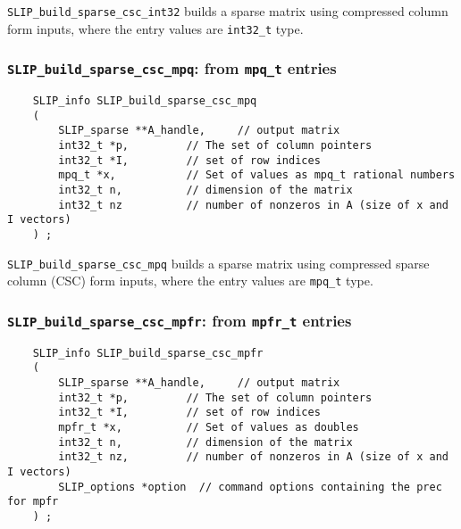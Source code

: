 \documentclass[12pt]{article}
\theoremstyle{definition}
\begin{document}
\verb|SLIP_build_sparse_csc_int32| builds a sparse matrix using compressed column
form inputs, where the entry values are \verb|int32_t| type.

\cprotect\subsubsection{\verb|SLIP_build_sparse_csc_mpq|: from \verb|mpq_t| entries}
\label{s:user:build_sparse_csc_mpq}

\begin{mdframed}[userdefinedwidth=6in]
{\footnotesize
\begin{verbatim}
    SLIP_info SLIP_build_sparse_csc_mpq
    (
        SLIP_sparse **A_handle,     // output matrix
        int32_t *p,         // The set of column pointers
        int32_t *I,         // set of row indices
        mpq_t *x,           // Set of values as mpq_t rational numbers
        int32_t n,          // dimension of the matrix
        int32_t nz          // number of nonzeros in A (size of x and I vectors)
    ) ;
\end{verbatim}
} \end{mdframed}

\verb|SLIP_build_sparse_csc_mpq| builds a sparse matrix using compressed
sparse column (CSC) form inputs, where the entry values are \verb|mpq_t| type.

\cprotect\subsubsection{\verb|SLIP_build_sparse_csc_mpfr|: from \verb|mpfr_t| entries}
\label{s:user:build_sparse_csc_mpfr}

\begin{mdframed}[userdefinedwidth=6in]
{\footnotesize
\begin{verbatim}
    SLIP_info SLIP_build_sparse_csc_mpfr
    (
        SLIP_sparse **A_handle,     // output matrix
        int32_t *p,         // The set of column pointers
        int32_t *I,         // set of row indices
        mpfr_t *x,          // Set of values as doubles
        int32_t n,          // dimension of the matrix
        int32_t nz,         // number of nonzeros in A (size of x and I vectors)
        SLIP_options *option  // command options containing the prec for mpfr
    ) ;
\end{verbatim}
} \end{mdframed}
\end{document}
